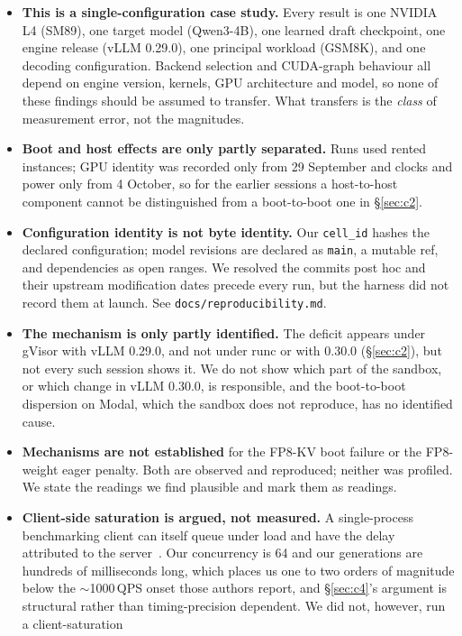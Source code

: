 \documentclass[11pt]{article}
\newcommand{\tw}[1]{\texttt{\small #1}}
\begin{document}
\begin{itemize}\itemsep2pt
\item \textbf{This is a single-configuration case study.} Every result is
one NVIDIA L4 (SM89), one target model (Qwen3-4B), one learned draft
checkpoint, one engine release (vLLM 0.29.0), one principal workload
(GSM8K), and one decoding configuration. Backend selection and CUDA-graph
behaviour all depend on engine version, kernels, GPU architecture and model,
so none of these findings should be assumed to transfer. What transfers is
the \emph{class} of measurement error, not the magnitudes.
\item \textbf{Boot and host effects are only partly separated.} Runs used
rented instances; GPU identity was recorded only from 29 September and clocks
and power only from 4 October, so for the earlier sessions a host-to-host
component cannot be distinguished from a boot-to-boot one in \S\ref{sec:c2}.
\item \textbf{Configuration identity is not byte identity.} Our
\tw{cell\_id} hashes the declared configuration; model revisions are
declared as \tw{main}, a mutable ref, and dependencies as open ranges. We
resolved the commits post hoc and their upstream modification dates precede
every run, but the harness did not record them at launch. See
\tw{docs/reproducibility.md}.
\item \textbf{The mechanism is only partly identified.} The deficit appears
under gVisor with vLLM 0.29.0, and not under runc or with 0.30.0
(\S\ref{sec:c2}), but not every such session shows it. We do not show which
part of the sandbox, or which change in vLLM 0.30.0, is responsible, and the
boot-to-boot dispersion on Modal, which the sandbox does not reproduce, has no
identified cause.
\item \textbf{Mechanisms are not established} for the FP8-KV boot failure or
the FP8-weight eager penalty. Both are observed and reproduced; neither was
profiled. We state the readings we find plausible and mark them as readings.
\item \textbf{Client-side saturation is argued, not measured.} A
single-process benchmarking client can itself queue under load and have the
delay attributed to the server~\cite{chandrasekar2026bias}. Our concurrency
is 64 and our generations are hundreds of milliseconds long, which places us
one to two orders of magnitude below the $\sim$1000\,QPS onset those authors
report, and \S\ref{sec:c4}'s argument is structural rather than
timing-precision dependent. We did not, however, run a client-saturation

\end{itemize}
\end{document}
